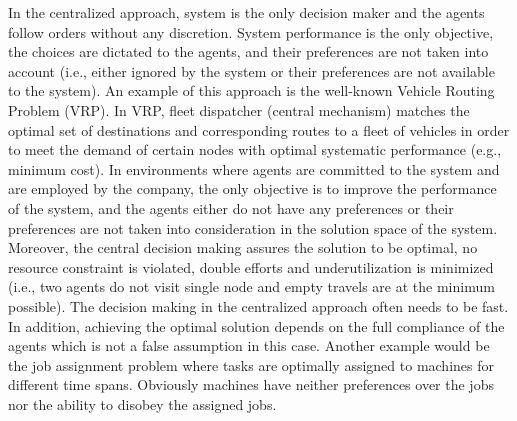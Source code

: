 \documentclass[11pt, letterpaper]{article}
\begin{document}
In the centralized approach, system is the only decision maker and the agents follow orders without any discretion. System performance is the only objective, the choices are dictated to the agents, and their preferences are not taken into account (i.e., either ignored by the system or their preferences are not available to the system). An example of this approach is the well-known Vehicle Routing Problem (VRP). In VRP, fleet dispatcher (central mechanism) matches the optimal set of destinations and corresponding routes to a fleet of vehicles in order to meet the demand of certain nodes with optimal systematic performance (e.g., minimum cost). In environments where agents are committed to the system and are employed by the company, the only objective is to improve the performance of the system, and the agents either do not have any preferences or their preferences are not taken into consideration in the solution space of the system. 
Moreover, the central decision making assures the solution to be optimal, no resource constraint is violated, double efforts and underutilization is minimized (i.e., two agents do not visit single node and empty travels are at the minimum possible). The decision making in the centralized approach often needs to be fast. In addition, achieving the optimal solution depends on the full compliance of the agents which is not a false assumption in this case. Another example would be the job assignment problem where tasks are optimally assigned to machines for different time spans. Obviously machines have neither preferences over the jobs nor the ability to disobey the assigned jobs.
\end{document}
